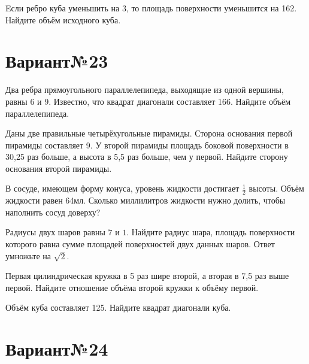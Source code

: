 \documentclass[4apaper]{article}
\begin{document}
\begin{taskBN}{6}
Eсли ребро куба уменьшить на 3, то площадь поверхности уменьшится на 162. Найдите объём исходного куба.
\end{taskBN}
\newpage\section*{Вариант№23}

\begin{taskBN}{1}
Два ребра прямоугольного параллелепипеда, выходящие из одной вершины, равны 6 и 9. Известно, что квадрат диагонали составляет 166. Найдите объём параллелепипеда.
\end{taskBN}

\begin{taskBN}{2}
Даны две правильные четырёхугольные пирамиды. Сторона основания первой пирамиды составляет 9. У второй пирамиды площадь боковой поверхности в 30,25 раз больше, а высота в 5,5 раз больше, чем у первой. Найдите сторону основания второй пирамиды.
\end{taskBN}

\begin{taskBN}{3}
В сосуде, имеющем форму конуса, уровень жидкости достигает $\frac{1}{2}$ высоты. Объём жидкости равен 64мл. Сколько миллилитров жидкости нужно долить, чтобы наполнить сосуд доверху?
\end{taskBN}

\begin{taskBN}{4}
Радиусы двух шаров равны $7$ и $1$. Найдите радиус шара, площадь поверхности которого равна сумме площадей поверхностей двух данных шаров. Ответ умножьте на $\sqrt{2}$.
\end{taskBN}

\begin{taskBN}{5}
 Первая цилиндрическая кружка в 5 раз шире второй, а вторая в 7,5 раз выше первой. Найдите отношение объёма второй кружки к объёму первой.
\end{taskBN}

\begin{taskBN}{6}
Объём куба составляет 125. Найдите квадрат диагонали куба.
\end{taskBN}
\newpage\section*{Вариант№24}
\end{document}
